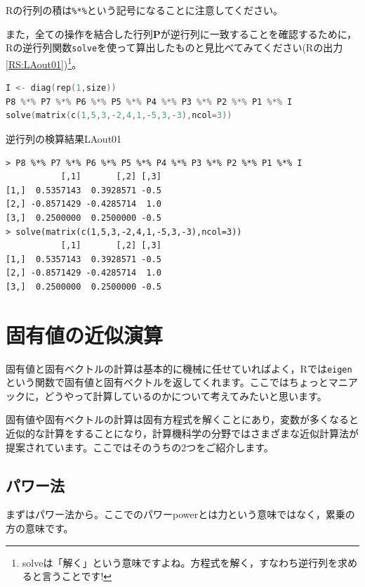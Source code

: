 \documentclass{ltjsbook}
\begin{document}
Rの行列の積は\verb|%*%|という記号になることに注意してください。

また，全ての操作を結合した行列$\bm{P}$が逆行列に一致することを確認するために，Rの逆行列関数\verb|solve|を使って算出したものと見比べてみてください(Rの出力\ref{RS:LAout01})\footnote{solveは「解く」という意味ですよね。方程式を解く，すなわち逆行列を求めると言うことです!}。
\begin{lstlisting}[language=C++,label={solve},caption={逆行列の算出}]
I <- diag(rep(1,size))
P8 %*% P7 %*% P6 %*% P5 %*% P4 %*% P3 %*% P2 %*% P1 %*% I
solve(matrix(c(1,5,3,-2,4,1,-5,3,-3),ncol=3))
\end{lstlisting}

\begin{Rscreen}{逆行列の検算結果}{LAout01}
	\begin{verbatim}
> P8 %*% P7 %*% P6 %*% P5 %*% P4 %*% P3 %*% P2 %*% P1 %*% I
           [,1]       [,2] [,3]
[1,]  0.5357143  0.3928571 -0.5
[2,] -0.8571429 -0.4285714  1.0
[3,]  0.2500000  0.2500000 -0.5
> solve(matrix(c(1,5,3,-2,4,1,-5,3,-3),ncol=3))
           [,1]       [,2] [,3]
[1,]  0.5357143  0.3928571 -0.5
[2,] -0.8571429 -0.4285714  1.0
[3,]  0.2500000  0.2500000 -0.5
 \end{verbatim}
\end{Rscreen}

\section{固有値の近似演算}

固有値と固有ベクトルの計算は基本的に機械に任せていればよく，Rでは\verb|eigen|という関数で固有値と固有ベクトルを返してくれます。ここではちょっとマニアックに，どうやって計算しているのかについて考えてみたいと思います。

固有値や固有ベクトルの計算は固有方程式を解くことにあり，変数が多くなると近似的な計算をすることになり，計算機科学の分野ではさまざまな近似計算法が提案されています。ここではそのうちの2つをご紹介します。
\subsection{パワー法}
まずはパワー法から。ここでのパワーpowerとは力という意味ではなく，累乗の方の意味です。
\end{document}
